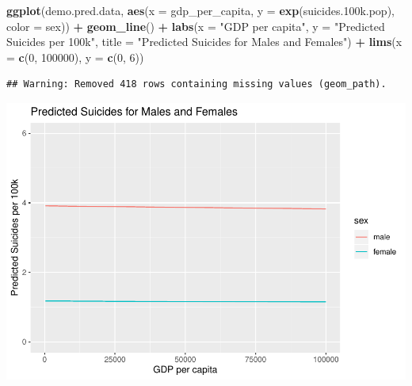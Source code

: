 \documentclass[11pt,]{article}
\newenvironment{Shaded}{\begin{snugshade}}{\end{snugshade}}
\newcommand{\CommentTok}[1]{\textcolor[rgb]{0.56,0.35,0.01}{\textit{#1}}}
\newcommand{\DataTypeTok}[1]{\textcolor[rgb]{0.13,0.29,0.53}{#1}}
\newcommand{\DecValTok}[1]{\textcolor[rgb]{0.00,0.00,0.81}{#1}}
\newcommand{\FloatTok}[1]{\textcolor[rgb]{0.00,0.00,0.81}{#1}}
\newcommand{\KeywordTok}[1]{\textcolor[rgb]{0.13,0.29,0.53}{\textbf{#1}}}
\newcommand{\NormalTok}[1]{#1}
\newcommand{\OperatorTok}[1]{\textcolor[rgb]{0.81,0.36,0.00}{\textbf{#1}}}
\newcommand{\OtherTok}[1]{\textcolor[rgb]{0.56,0.35,0.01}{#1}}
\newcommand{\StringTok}[1]{\textcolor[rgb]{0.31,0.60,0.02}{#1}}
\begin{document}
\begin{Shaded}
\begin{Highlighting}[]
\KeywordTok{ggplot}\NormalTok{(demo.pred.data, }\KeywordTok{aes}\NormalTok{(}\DataTypeTok{x =}\NormalTok{ gdp_per_capita, }\DataTypeTok{y =} \KeywordTok{exp}\NormalTok{(suicides}\FloatTok{.100}\NormalTok{k.pop), }\DataTypeTok{color =}\NormalTok{ sex)) }\OperatorTok{+}\StringTok{ }
\StringTok{  }\KeywordTok{geom_line}\NormalTok{() }\OperatorTok{+}\StringTok{ }
\StringTok{  }\KeywordTok{labs}\NormalTok{(}\DataTypeTok{x =} \StringTok{"GDP per capita"}\NormalTok{, }\DataTypeTok{y =} \StringTok{"Predicted Suicides per 100k"}\NormalTok{, }\DataTypeTok{title =} \StringTok{"Predicted Suicides for Males and Females"}\NormalTok{) }\OperatorTok{+}
\StringTok{  }\KeywordTok{lims}\NormalTok{(}\DataTypeTok{x =} \KeywordTok{c}\NormalTok{(}\DecValTok{0}\NormalTok{, }\DecValTok{100000}\NormalTok{), }\DataTypeTok{y =} \KeywordTok{c}\NormalTok{(}\DecValTok{0}\NormalTok{, }\DecValTok{6}\NormalTok{))}
\end{Highlighting}
\end{Shaded}

\begin{verbatim}
## Warning: Removed 418 rows containing missing values (geom_path).
\end{verbatim}

\includegraphics{An-Analysis-of-Suicide-Data_files/figure-latex/unnamed-chunk-2-8.pdf}

\begin{Shaded}
\end{Shaded}
\end{document}
